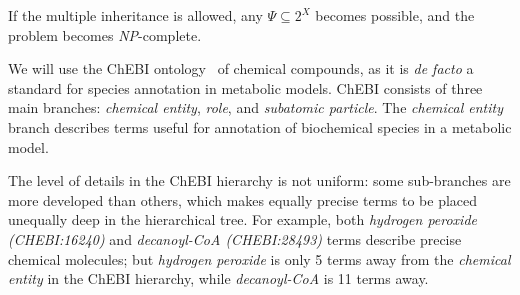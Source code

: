 \documentclass[9pt]{article}
\newcounter{rm}
\begin{document}
If the multiple inheritance is allowed, any $\Psi \subseteq 2^X$ becomes possible, and the problem becomes \textit{NP}-complete. 

We will use the ChEBI ontology~\citep{deMatos10} of chemical compounds, as it is \textit{de facto} a standard for species annotation in metabolic models. ChEBI consists of three main branches: \textit{chemical entity}, \textit{role}, and \textit{subatomic particle}. The \textit{chemical entity} branch describes terms useful for annotation of biochemical species in a metabolic model. %

The level of details in the ChEBI hierarchy is not uniform: some sub-branches are more developed than others, which makes equally precise terms to be placed unequally deep in the hierarchical tree. For example, both \textit{hydrogen peroxide (CHEBI:16240)} and \textit{decanoyl-CoA (CHEBI:28493)} terms describe precise chemical molecules; but \textit{hydrogen peroxide} is only 5 terms away from the \textit{chemical entity} in the ChEBI hierarchy, while \textit{decanoyl-CoA} is 11 terms away. 
\end{document}
